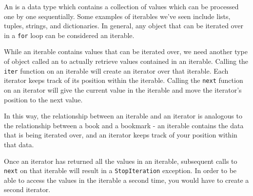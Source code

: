 An  is a data type which contains
a collection of values which can be processed one by one 
sequentially. Some examples of iterables we've seen include
lists, tuples, strings, and dictionaries. In general, any
object that can be iterated over in a \lstinline$for$ loop
can be considered an iterable.


While an iterable contains values that can be iterated over,
we need another type of object called an 
to actually retrieve values contained in an iterable. Calling
the \lstinline$iter$ function on an iterable will create an iterator
over that iterable. Each iterator keeps track of its position within
the iterable. Calling the \lstinline$next$ function on an iterator will 
give the current value in the iterable and move the iterator's position 
to the next value. 


In this way, the relationship between an
iterable and an iterator is analogous to the relationship between
a book and a bookmark - an iterable contains the data that is
being iterated over, and an iterator keeps track of your position 
within that data.


Once an iterator has returned all the values in an iterable, subsequent
calls to \lstinline$next$ on that iterable will result in a 
\lstinline$StopIteration$ exception. In order to be able to access the values
in the iterable a second time, you would have to create a second iterator.

